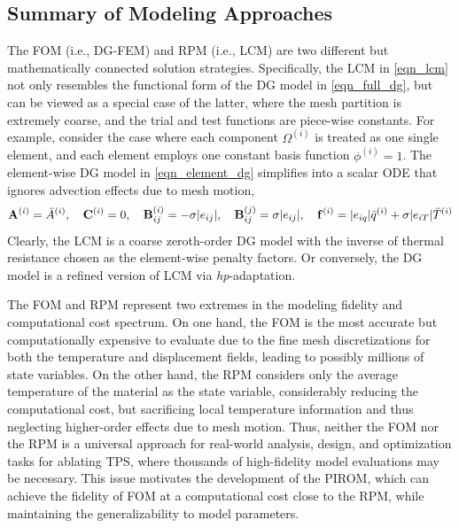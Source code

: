\subsection{Summary of Modeling Approaches}

The FOM (i.e., DG-FEM) and RPM (i.e., LCM) are two different but mathematically connected solution strategies. Specifically, the LCM in \cref{eqn_lcm} not only resembles the functional form of the DG model in \cref{eqn_full_dg}, but can be viewed as a special case of the latter, where the mesh partition is extremely coarse, and the trial and test functions are piece-wise constants. For example, consider the case where each component $\Omega^{(i)}$ is treated as one single element, and each element employs one constant basis function $\phi^{(i)}=1$. The element-wise DG model in \cref{eqn_element_dg} simplifies into a scalar ODE that ignores advection effects due to mesh motion,
\begin{equation}
    \mathbf{A}^{(i)} = \bar{A}^{(i)},\quad \mathbf{C}^{(i)} = 0, \quad\mathbf{B}^{(i)}_{ij} = -\sigma|e_{ij}|,\quad \mathbf{B}^{(j)}_{ij}=\sigma|e_{ij}|,\quad \mathbf{f}^{(i)} = |e_{iq}|\bar{q}^{(i)} + \sigma|e_{iT}|\bar{T}^{(i)}
\end{equation}
Clearly, the LCM is a coarse zeroth-order DG model with the inverse of thermal resistance chosen as the element-wise penalty factors. Or conversely, the DG model is a refined version of LCM via \textit{hp}-adaptation.

The FOM and RPM represent two extremes in the modeling fidelity and computational cost spectrum. On one hand, the FOM is the most accurate but computationally expensive to evaluate due to the fine mesh discretizations for both the temperature and displacement fields, leading to possibly millions of state variables. On the other hand, the RPM considers only the average temperature of the material as the state variable, considerably reducing the computational cost, but sacrificing local temperature information and thus neglecting higher-order effects due to mesh motion. Thus, neither the FOM nor the RPM is a universal approach for real-world analysis, design, and optimization tasks for ablating TPS, where thousands of high-fidelity model evaluations may be necessary. This issue motivates the development of the PIROM, which can achieve the fidelity of FOM at a computational cost close to the RPM, while maintaining the generalizability to model parameters.